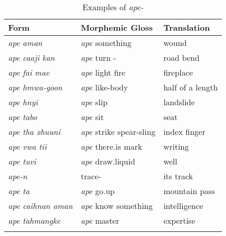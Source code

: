 \begin{table}
	\centering
	\caption{Examples of \textit{ape-}}
	\begin{tabular}{lll}
	\lsptoprule
		Form & Morphemic Gloss & Translation \\\midrule
		\textit{ape aman}	& \textit{ape} something& wound\\
		\textit{ape caaji kan}	& \textit{ape} turn \gl{link}-\gl{nspec} & road bend\\
		\textit{ape fai mae} & \textit{ape} light fire & fireplace\\
		\textit{ape hmwa-goon} & \textit{ape} like-body&	half of a length\\
		\textit{ape hnyi} & \textit{ape} slip&	landslide\\
		\textit{ape tabo}& \textit{ape} sit & seat\\
		\textit{ape tha xhuuni}	& \textit{ape} strike spear-sling & index finger\\
		\textit{ape vwa tii}	& \textit{ape} there.is mark & writing\\
		\textit{ape tuvi}& \textit{ape} draw.liquid&	well\\
		\midrule
		\textit{ape-n} & trace-\gl{poss}	& its track \\
		\textit{ape ta} & \textit{ape} go.up&	mountain pass\\
		\textit{ape caihnan aman} & \textit{ape} know something& intelligence\\
		\textit{ape tahmangke} & \textit{ape} master &	expertise\\
	\lspbottomrule
	\end{tabular}
\label{tab:ape}
\end{table}

